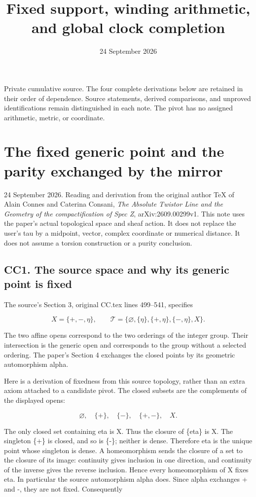 \documentclass[
  11pt,
]{article}
\title{Fixed support, winding arithmetic, and global clock completion}
\author{}
\date{24 September 2026}
\begin{document}
\maketitle

Private cumulative source. The four complete derivations below are
retained in their order of dependence. Source statements, derived
comparisons, and unproved identifications remain distinguished in each
note. The pivot has no assigned arithmetic, metric, or coordinate.

\section{The fixed generic point and the parity exchanged by the
mirror}\label{the-fixed-generic-point-and-the-parity-exchanged-by-the-mirror}

24 September 2026. Reading and derivation from the original author TeX
of Alain Connes and Caterina Consani, \emph{The Absolute Twistor Line
and the Geometry of the compactification of Spec Z}, arXiv:2609.00299v1.
This note uses the paper's actual topological space and sheaf action. It
does not replace the user's tau by a midpoint, vector, complex
coordinate or numerical distance. It does not assume a torsion
construction or a purity conclusion.

\subsection{CC1. The source space and why its generic point is
fixed}\label{cc1.-the-source-space-and-why-its-generic-point-is-fixed}

The source's Section 3, original CC.tex lines 499--541, specifies

\[
X=\{+, -,\eta\},\qquad
\mathcal T=\{\varnothing,\{\eta\},\{+,\eta\},\{-,\eta\},X\}.
\]

The two affine opens correspond to the two orderings of the integer
group. Their intersection is the generic open and corresponds to the
group without a selected ordering. The paper's Section 4 exchanges the
closed points by its geometric automorphism alpha.

Here is a derivation of fixedness from this source topology, rather than
an extra axiom attached to a candidate pivot. The closed subsets are the
complements of the displayed opens:

\[
\varnothing,\quad\{+\},\quad\{-\},\quad\{+,-\},\quad X.
\]

The only closed set containing eta is X. Thus the closure of \{eta\} is
X. The singleton \{+\} is closed, and so is \{-\}; neither is dense.
Therefore eta is the unique point whose singleton is dense. A
homeomorphism sends the closure of a set to the closure of its image:
continuity gives inclusion in one direction, and continuity of the
inverse gives the reverse inclusion. Hence every homeomorphism of X
fixes eta. In particular the source automorphism alpha does. Since alpha
exchanges + and -, they are not fixed. Consequently
\end{document}

